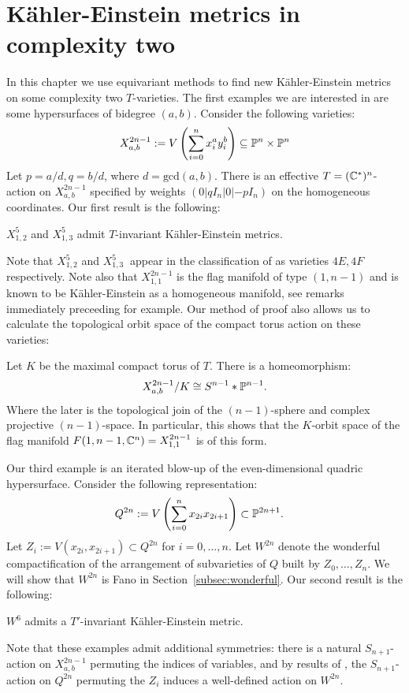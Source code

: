 \chapter{K\"ahler-Einstein metrics in complexity two} \label{chap:gav}
In this chapter we use equivariant methods to find new K\"ahler-Einstein metrics on some complexity two \(T\)-varieties. The first examples we are interested in are some hypersurfaces of  bidegree \((a,b)\). Consider the following varieties:
\[
X_{a,b}^{2n-1} := V \left( \sum_{i=0}^n x_i^a y_i^b \right) \subseteq \mathbb{P}^n \times \mathbb{P}^n
\]
%
%
Let \(p = a/d, q = b/d\), where \(d = \text{gcd}(a,b)\). There is an effective \(T = (\mathbb{C}^*)^n\)-action on \(X_{a,b}^{2n-1}\) specified by weights \((0|q I_n|0|-p I_n)\) on the homogeneous coordinates. Our first result is the following:
\begin{theorem}\label{thm:KE1}
\(X_{1,2}^5\) and \( X_{1,3}^5\) admit \(T\)-invariant K\"ahler-Einstein metrics.
\end{theorem}
Note that \(X_{1,2}^5\) and \(X_{1,3}^5\ \) appear in the classification of \cite{hausen2018torus} as varieties \(4E, 4F\) respectively. Note also that \(X_{1,1}^{2n-1}\) is the flag manifold of type \((1,n-1)\) and is known to be K\"ahler-Einstein as a homogeneous manifold, see remarks immediately preceeding \cite[Theorem 3]{Matsushima} for example. Our method of proof also allows us to calculate the topological orbit space of the compact torus action on these varieties:
\begin{corollary}\label{cor:topquot}
Let \(K\) be the maximal compact torus of \(T\). There is a homeomorphism:
\[
X_{a,b}^{2n-1}/K \cong S^{n-1} \ast \mathbb{P}^{n-1}.
\]
Where the later is the topological join of the \((n-1)\)-sphere and complex projective \((n-1)\)-space. In particular, this shows that the \(K\)-orbit space of the flag manifold \(F(1,n-1,\mathbb{C}^n) = X_{1,1}^{2n-1}\) is of this form.
\end{corollary}
Our third example is an iterated blow-up of the even-dimensional quadric hypersurface. Consider the following representation:
\begin{align*}
Q^{2n} &:= V \left( \sum_{i=0}^{n} x_{2i}x_{2i+1} \right) \subset \mathbb{P}^{2n+1}.
\end{align*}
Let \(Z_i := V(x_{2i},x_{2i+1}) \subset Q^{2n}\) for \(i=0,\dots,n\). Let \(W^{2n}\) denote the wonderful compactification of the arrangement of subvarieties of \(Q\) built by \(Z_0,\dots,Z_n\). We will show that \(W^{2n}\) is Fano in Section~\ref{subsec:wonderful}. Our second result is the following:
\begin{theorem}\label{thm:KE2}
\(W^6\) admits a \(T'\)-invariant K\"ahler-Einstein metric.
\end{theorem}
Note that these examples admit additional symmetries: there is a natural \(S_{n+1}\)-action on \(X^{2n-1}_{a,b}\) permuting the indices of variables, and by results of \cite{li06}, the \(S_{n+1}\)-action on \(Q^{2n}\) permuting the \(Z_i\) induces a well-defined action on \(W^{2n}\).
